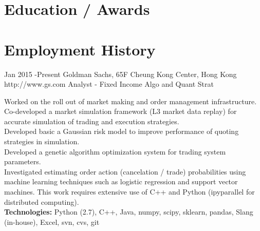 \documentclass[10pt,hidelinks]{article} %
\begin{document}

\section{Education / Awards}







\section{Employment History}

\job
{Jan 2015 -}{Present}
{Goldman Sachs, 65F Cheung Kong Center, Hong Kong}
{http://www.gs.com}
{Analyst - Fixed Income Algo and Quant Strat}
{

Worked on the roll out of market making and order management infrastructure. \\
Co-developed a market simulation framework (L3 market data replay) for accurate simulation
of trading and execution strategies.\\
Developed basic a Gaussian risk model to improve performance of quoting strategies in simulation. \\
Developed a genetic algorithm optimization system for trading system parameters. \\
Investigated estimating order action (cancelation / trade) probabilities using machine learning techniques
such as logistic regression and support vector machines.
This work requires extensive use of C++ and Python (ipyparallel for distributed computing).\\


\textbf{Technologies:} Python (2.7), C++, Java, numpy, scipy, sklearn, pandas, Slang (in-house), Excel, svn, cvs, git
}
\end{document}
